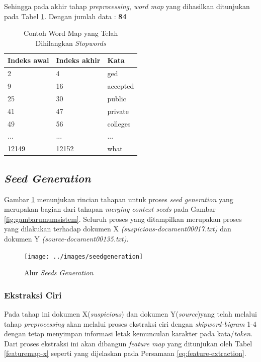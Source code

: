 \documentclass[../Book.tex]{subfiles}
\begin{document}
	\noindent Sehingga pada akhir tahap \textit{preprocessing}, \textit{word map} yang dihasilkan ditunjukan pada Tabel \ref{cleanwordmap}. Dengan jumlah data : \textbf{84}
	
	\begin{table}[H]
		\centering
		\caption{Contoh Word Map yang Telah Dihilangkan \textit{Stopwords}}
		\label{cleanwordmap}
		\begin{tabular}{@{}lll@{}}
			\toprule
			Indeks awal & Indeks akhir & Kata     \\ \midrule
			2           & 4            & ged    \\
			9          & 16           & accepted   \\
			25			& 30		   & public \\
			41 & 47 & private \\
			49 & 56 & colleges \\
			...         & ...          & ...      \\
			12149         & 12152          & what \\ \bottomrule
		\end{tabular}
	\end{table}

	\subsection{\textit{Seed Generation}}
	\noindent Gambar \ref{fig:flowseed} menunjukan rincian tahapan untuk proses \textit{seed generation} yang merupakan bagian dari tahapan \textit{merging context seeds} pada Gambar \ref{fig:gambarumumsistem}. Seluruh proses yang ditampilkan merupakan proses yang dilakukan terhadap dokumen X \textit{(suspicious-document00017.txt)} dan dokumen Y \textit{(source-document00135.txt)}.
	
	\begin{center}
		\begin{figure}[H]
			\texttt{[image: ../images/seedgeneration]}
			\caption{Alur \textit{Seeds Generation}}
			\label{fig:flowseed}
		\end{figure}
	\end{center}

	\subsubsection{Ekstraksi Ciri}
	Pada tahap ini dokumen X(\textit{suspicious}) dan dokumen Y(\textit{source})yang telah melalui tahap \textit{preprocessing} akan melalui proses ekstraksi ciri dengan \textit{skipword-bigram} 1-4 dengan tetap menyimpan informasi letak kemunculan karakter pada kata/\textit{token}. Dari proses ekstraksi ini akan dibangun \textit{feature map} yang ditunjukan oleh Tabel \ref{featuremap-x} seperti yang dijelaskan pada Persamaan \ref{eq:feature-extraction}. 
	
\end{document}
